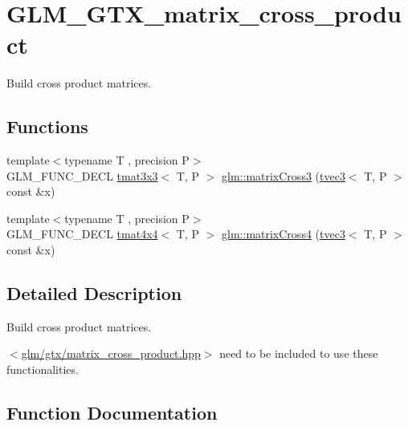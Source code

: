 \hypertarget{group__gtx__matrix__cross__product}{}\section{G\+L\+M\+\_\+\+G\+T\+X\+\_\+matrix\+\_\+cross\+\_\+product}
\label{group__gtx__matrix__cross__product}


Build cross product matrices.  


\subsection*{Functions}
\begin{DoxyCompactItemize}
\item 
{\footnotesize template$<$typename T , precision P$>$ }\\G\+L\+M\+\_\+\+F\+U\+N\+C\+\_\+\+D\+E\+CL \hyperlink{structglm_1_1tmat3x3}{tmat3x3}$<$ T, P $>$ \hyperlink{group__gtx__matrix__cross__product_ga04385b2e3a93c78d116b51af2d8d708e}{glm\+::matrix\+Cross3} (\hyperlink{structglm_1_1tvec3}{tvec3}$<$ T, P $>$ const \&x)
\item 
{\footnotesize template$<$typename T , precision P$>$ }\\G\+L\+M\+\_\+\+F\+U\+N\+C\+\_\+\+D\+E\+CL \hyperlink{structglm_1_1tmat4x4}{tmat4x4}$<$ T, P $>$ \hyperlink{group__gtx__matrix__cross__product_ga2d46cc5253761c214aa5c782865156b1}{glm\+::matrix\+Cross4} (\hyperlink{structglm_1_1tvec3}{tvec3}$<$ T, P $>$ const \&x)
\end{DoxyCompactItemize}


\subsection{Detailed Description}
Build cross product matrices. 

$<$\hyperlink{matrix__cross__product_8hpp}{glm/gtx/matrix\+\_\+cross\+\_\+product.\+hpp}$>$ need to be included to use these functionalities. 

\subsection{Function Documentation}
\mbox{\label{group__gtx__matrix__cross__product_ga04385b2e3a93c78d116b51af2d8d708e}} 
